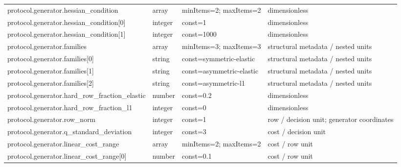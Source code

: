 \begin{longtable}{@{}>{\raggedright\arraybackslash}p{}>{\raggedright\arraybackslash}p{}>{\raggedright\arraybackslash}p{}>{\raggedright\arraybackslash}p{}@{}}
protocol.\allowbreak{}generator.\allowbreak{}hessian\_\allowbreak{}condition & array & minItems=\allowbreak{}2; maxItems=\allowbreak{}2 & dimensionless\\
protocol.\allowbreak{}generator.\allowbreak{}hessian\_\allowbreak{}condition[0] & integer & const=\allowbreak{}1 & dimensionless\\
protocol.\allowbreak{}generator.\allowbreak{}hessian\_\allowbreak{}condition[1] & integer & const=\allowbreak{}1000 & dimensionless\\
protocol.\allowbreak{}generator.\allowbreak{}families & array & minItems=\allowbreak{}3; maxItems=\allowbreak{}3 & structural metadata /\allowbreak{} nested units\\
protocol.\allowbreak{}generator.\allowbreak{}families[0] & string & const=\allowbreak{}symmetric-\allowbreak{}elastic & structural metadata /\allowbreak{} nested units\\
protocol.\allowbreak{}generator.\allowbreak{}families[1] & string & const=\allowbreak{}asymmetric-\allowbreak{}elastic & structural metadata /\allowbreak{} nested units\\
protocol.\allowbreak{}generator.\allowbreak{}families[2] & string & const=\allowbreak{}asymmetric-\allowbreak{}l1 & structural metadata /\allowbreak{} nested units\\
protocol.\allowbreak{}generator.\allowbreak{}hard\_\allowbreak{}row\_\allowbreak{}fraction\_\allowbreak{}elastic & number & const=\allowbreak{}0.\allowbreak{}2 & dimensionless\\
protocol.\allowbreak{}generator.\allowbreak{}hard\_\allowbreak{}row\_\allowbreak{}fraction\_\allowbreak{}l1 & integer & const=\allowbreak{}0 & dimensionless\\
protocol.\allowbreak{}generator.\allowbreak{}row\_\allowbreak{}norm & integer & const=\allowbreak{}1 & row /\allowbreak{} decision unit; generator coordinates\\
protocol.\allowbreak{}generator.\allowbreak{}q\_\allowbreak{}standard\_\allowbreak{}deviation & integer & const=\allowbreak{}3 & cost /\allowbreak{} decision unit\\
protocol.\allowbreak{}generator.\allowbreak{}linear\_\allowbreak{}cost\_\allowbreak{}range & array & minItems=\allowbreak{}2; maxItems=\allowbreak{}2 & cost /\allowbreak{} row unit\\
protocol.\allowbreak{}generator.\allowbreak{}linear\_\allowbreak{}cost\_\allowbreak{}range[0] & number & const=\allowbreak{}0.\allowbreak{}1 & cost /\allowbreak{} row unit\\

\end{longtable}
